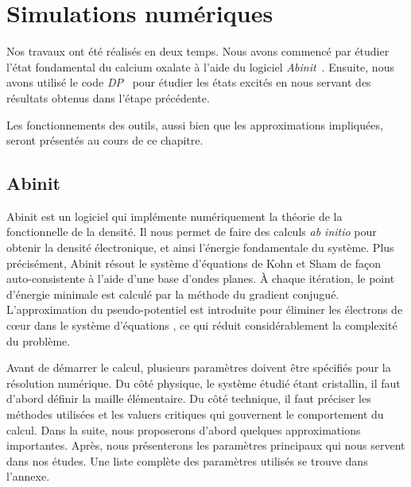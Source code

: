 \chapter{Simulations numériques}
\label{chap-simulation}
Nos travaux ont été réalisés en deux temps.
Nous avons commencé par étudier l'état fondamental du calcium oxalate à l'aide du logiciel \textit{Abinit}~\cite{Abinit}.
Ensuite, nous avons utilisé le code \textit{DP}~\cite{DP} pour étudier les états excités
en nous servant des résultats obtenus dans l'étape précédente.

Les fonctionnements des outils, aussi bien que les approximations impliquées,
seront présentés au cours de ce chapitre.

\section{Abinit}
\label{sec-abinit}
Abinit est un logiciel qui implémente numériquement la théorie de la fonctionnelle de la densité.
Il nous permet de faire des calculs \textit{ab initio} pour obtenir la densité électronique,
et ainsi l'énergie fondamentale du système.
Plus précisément, Abinit résout le système d'équations de Kohn et Sham de façon auto-consistente à l'aide d'une base d'ondes planes.
À chaque itération, le point d'énergie minimale est calculé par la méthode du gradient conjugué.
L'approximation du pseudo-potentiel est introduite pour éliminer les électrons de cœur dans le système d'équations ,
ce qui réduit considérablement la complexité du problème.

Avant de démarrer le calcul,
plusieurs paramètres doivent être spécifiés pour la résolution numérique.
Du côté physique, le système étudié étant cristallin,
il faut d'abord définir la maille élémentaire.
Du côté technique, il faut préciser les méthodes utilisées et les valuers critiques qui gouvernent le comportement du calcul.
Dans la suite, nous proposerons d'abord quelques approximations importantes. Après,
nous présenterons les paramètres principaux qui nous servent dans nos études.
Une liste complète des paramètres utilisés se trouve dans l'annexe.

